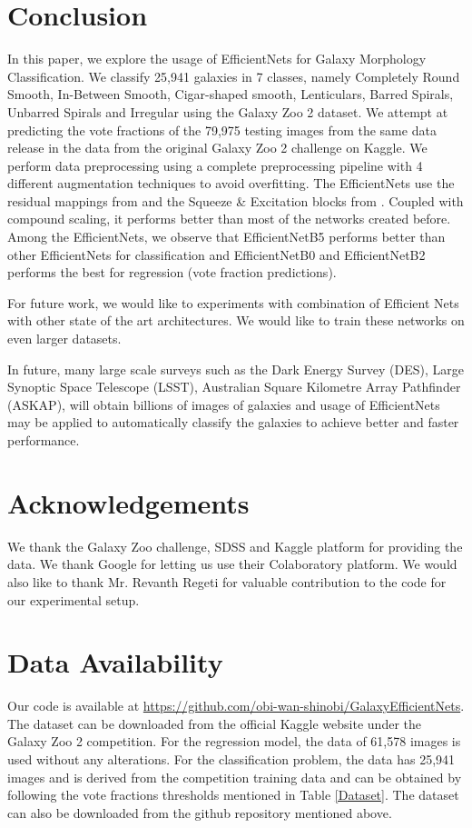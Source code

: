 \documentclass[fleqn,usenatbib]{mnras}
\begin{document}
\section{Conclusion}
\hspace*{0.25 in}In this paper, we explore the usage of EfficientNets for Galaxy Morphology Classification. We classify 25,941 galaxies in 7 classes, namely Completely Round Smooth, In-Between Smooth, Cigar-shaped smooth, Lenticulars, Barred Spirals, Unbarred Spirals and Irregular using the Galaxy Zoo 2 dataset.  We attempt at predicting the vote fractions of the 79,975 testing images from the same data release in the data from the original Galaxy Zoo 2 challenge on Kaggle. We perform data preprocessing using a complete preprocessing pipeline with 4 different augmentation techniques to avoid overfitting. The EfficientNets use the residual mappings from \citet{he2016} and the Squeeze \& Excitation blocks from \citet{hu2018squeeze}. Coupled with compound scaling, it performs better than most of the networks created before. Among the EfficientNets, we observe that EfficientNetB5 performs better than other EfficientNets for classification and EfficientNetB0 and EfficientNetB2 performs the best for regression (vote fraction predictions).

For future work, we would like to experiments with combination of Efficient Nets with other state of the art architectures. We would like to train these networks on even larger datasets.

In future, many large scale surveys such as the Dark Energy Survey (DES), Large Synoptic Space Telescope (LSST), Australian Square Kilometre Array Pathfinder (ASKAP), will obtain billions of images of galaxies and usage of EfficientNets may be applied to automatically classify the galaxies to achieve better and faster performance. 

\section{Acknowledgements}
\hspace*{0.25 in}We thank the Galaxy Zoo challenge, SDSS and Kaggle platform for providing the data. We thank Google for letting us use their Colaboratory platform. We would also like to thank Mr. Revanth Regeti for valuable contribution to the code for our experimental setup.

\section{Data Availability}
Our code is available at \href{https://github.com/obi-wan-shinobi/GalaxyEfficientNets}{https://github.com/obi-wan-shinobi/GalaxyEfficientNets}. The dataset can be downloaded from the official Kaggle website under the Galaxy Zoo 2 competition. For the regression model, the data of 61,578 images is used without any alterations. For the classification problem, the data has 25,941 images and is derived from the competition training data and can be obtained by following the vote fractions thresholds mentioned in Table \ref{Dataset}. The dataset can also be downloaded from the github repository mentioned above. 
\end{document}
